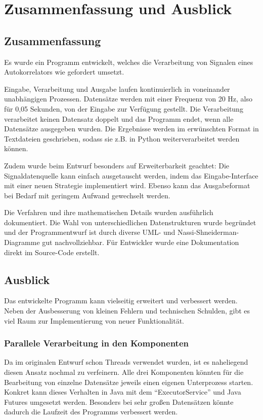 \chapter{Zusammenfassung und Ausblick}\label{ch:zusammenfassung-und-ausblick}

\section{Zusammenfassung}\label{sec:zusammenfassung}
Es wurde ein Programm entwickelt, welches die Verarbeitung von Signalen eines Autokorrelators wie gefordert umsetzt.

Eingabe, Verarbeitung und Ausgabe laufen kontinuierlich in voneinander unabhängigen Prozessen.
Datensätze werden mit einer Frequenz von 20 Hz, also für 0,05 Sekunden, von der Eingabe zur Verfügung gestellt.
Die Verarbeitung verarbeitet keinen Datensatz doppelt und das Programm endet, wenn alle Datensätze ausgegeben wurden.
Die Ergebnisse werden im erwünschten Format in Textdateien geschrieben, sodass sie z.B. in Python weiterverarbeitet werden können.

Zudem wurde beim Entwurf besonders auf Erweiterbarkeit geachtet:
Die Signaldatenquelle kann einfach ausgetauscht werden, indem das Eingabe-Interface mit einer neuen Strategie implementiert wird.
Ebenso kann das Ausgabeformat bei Bedarf mit geringem Aufwand gewechselt werden.

Die Verfahren und ihre mathematischen Details wurden ausführlich dokumentiert.
Die Wahl von unterschiedlichen Datenstrukturen wurde begründet und der Programmentwurf ist durch diverse UML- und Nassi-Shneiderman-Diagramme gut nachvollziehbar.
Für Entwickler wurde eine Dokumentation direkt im Source-Code erstellt.


\section{Ausblick}\label{sec:ausblick}
Das entwickelte Programm kann vielseitig erweitert und verbessert werden.
Neben der Ausbesserung von kleinen Fehlern und technischen Schulden, gibt es viel Raum zur Implementierung von neuer Funktionalität.

\subsection{Parallele Verarbeitung in den Komponenten}\label{subsec:parallel}
Da im originalen Entwurf schon Threads verwendet wurden, ist es naheliegend diesen Ansatz nochmal zu verfeinern.
Alle drei Komponenten könnten für die Bearbeitung von einzelne Datensätze jeweils einen eigenen Unterprozess starten.
Konkret kann dieses Verhalten in Java mit dem \enquote{ExecutorService} und Java Futures umgesetzt werden.
Besonders bei sehr großen Datensätzen könnte dadurch die Laufzeit des Programms verbessert werden.

